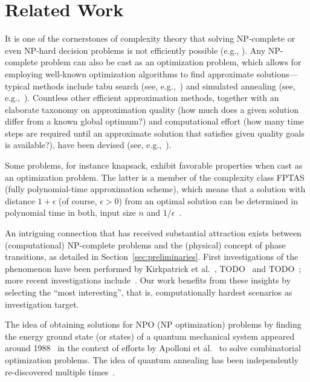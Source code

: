 \section{Related Work}
\label{sec:related-work}

It is one of the cornerstones of complexity theory that solving NP-complete or even NP-hard decision problems is not efficiently possible (e.g., \cite{cook1971complexity,murty1987some}). Any NP-complete problem can also be cast as an optimization problem, which allows for employing well-known optimization algorithms to find approximate solutions---typical methods include tabu search (see, e.g.,~\cite{glover2013tabu,gendreau1994tabu}) and simulated annealing (see, e.g.,~\cite{kirkpatrick1983optimization,chen1995chaotic}). Countless other efficient approximation methods, together with an elaborate taxonomy on approximation quality (how much does a given solution differ from a known global optimum?) and computational effort (how many time steps are required until an approximate solution that satisfies given quality goals is available?), have been devised (see, e.g.,~\cite{NPO-Compendium}).

Some problems, for instance knapsack, exhibit favorable properties when cast as an optimization problem. The latter is a member of the complexity class FPTAS (fully polynomial-time approximation scheme), which means that a solution with distance \(1+\epsilon\) (of course, $\epsilon > 0$) from an optimal solution can be determined in polynomial time in both, input size \(n\) and \(1/\epsilon\)~\cite{chen1995chaotic}.

An intriguing connection that has received substantial attraction exists between (computational) NP-complete problems and the (physical) concept of phase transitions, as detailed in Section~\ref{sec:preliminaries}. First investigations of the phenomenon have been performed by Kirkpatrick et al.~\cite{kirkpatrick1994critical}, TODO~\cite{TODO monasson1999determining} and TODO~\cite{TODO}; more recent investigations include~\cite{TODO, TODO, TODO}. Our work benefits from these insights by selecting the ``most interesting'', that is, computationally hardest scenarios as investigation target.

The idea of obtaining solutions for NPO (NP optimization) problems by finding the energy ground state (or states) of a quantum mechanical system appeared around 1988~\cite{TODO: Originalpaper,albash2016adiabatic} in the context of efforts by Apolloni et al.~\cite{apolloni1989quantum,apolloni1988numerical} to solve combinatorial optimization problems.  The idea of quantum annealing has been independently re-discovered multiple times~\cite{albash2016adiabatic,finnila1994quantum,amara1993global,kadowaki1998quantum}.

